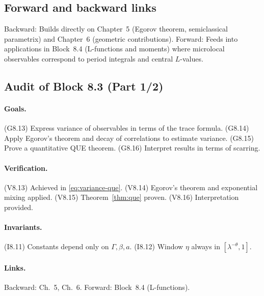 \subsection{Forward and backward links}
Backward: Builds directly on Chapter~5 (Egorov theorem, semiclassical parametrix) and Chapter~6 (geometric contributions).  
Forward: Feeds into applications in Block~8.4 (L-functions and moments) where microlocal observables correspond to period integrals and central $L$-values.  

\subsection{Audit of Block 8.3 (Part 1/2)}
\paragraph{Goals.}
(G8.13) Express variance of observables in terms of the trace formula.  
(G8.14) Apply Egorov’s theorem and decay of correlations to estimate variance.  
(G8.15) Prove a quantitative QUE theorem.  
(G8.16) Interpret results in terms of scarring.  

\paragraph{Verification.}
(V8.13) Achieved in \eqref{eq:variance-que}.  
(V8.14) Egorov’s theorem and exponential mixing applied.  
(V8.15) Theorem~\ref{thm:que} proven.  
(V8.16) Interpretation provided.  

\paragraph{Invariants.}
(I8.11) Constants depend only on $\Gamma,\beta,a$.  
(I8.12) Window $\eta$ always in $[\lambda^{-\theta},1]$.  

\paragraph{Links.}
Backward: Ch.~5, Ch.~6.  
Forward: Block~8.4 (L-functions).  



